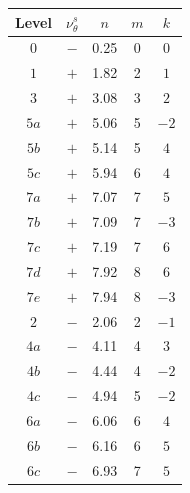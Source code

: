 \documentclass[aps,reprint,superscriptaddress,nofootinbib,floatfix,longbibliography,preprintnumbers]{revtex4-1}
\begin{document}
   \begin{table}[!htbp]
\renewcommand\arraystretch{1.2} 
\setlength\tabcolsep{7pt} 
\centering
\begin{tabular}{ccccc}\hline\hline

Level &         $\nu_{\theta}^s$         &         $n$         &         $m$         &         $k$          \\  \hline

        $0$         &         $-$         & 0.25 & 0 &         $0$          \\ 

        $1$         &         $+$         & 1.82 & 2 &         $1$          \\ 

        $3$         &         $+$         & 3.08 & 3 &         $2$          \\ 

        $5a$         &         $+$         & 5.06 & 5 &         $-2$          \\ 
        $5b$         &         $+$         & 5.14 & 5 &         $4$          \\ 
        $5c$         &         $+$         & 5.94 & 6 &         $4$          \\ 

        $7a$         &         $+$         & 7.07 & 7 &         $5$          \\ 
        $7b$         &         $+$         & 7.09 & 7 &         $-3$          \\ 
        $7c$         &         $+$         & 7.19 & 7 &         $6$          \\ 
        $7d$         &         $+$         & 7.92 & 8 &         $6$          \\ 
        $7e$         &         $+$         & 7.94 & 8 &         $-3$          \\ 

        $2$         &         $-$         & 2.06 & 2 &         $-1$          \\ 

        $4a$         &         $-$         & 4.11 & 4 &         $3$          \\ 
        $4b$         &         $-$         & 4.44 & 4 &         $-2$          \\ 
        $4c$         &         $-$         & 4.94 & 5 &         $-2$          \\ 

        $6a$         &         $-$         & 6.06 & 6 &         $4$          \\ 
        $6b$         &         $-$         & 6.16 & 6 &         $5$          \\ 
        $6c$         &         $-$         & 6.93 & 7 &         $5$          \\ 


\end{tabular}
\end{table}
\end{document}
